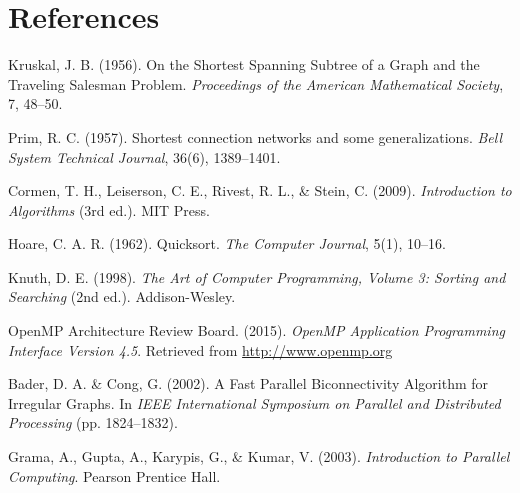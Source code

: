 \documentclass[11pt]{article}
\begin{document}
\section*{References}
\begin{thebibliography}{9}

Kruskal, J. B. (1956). On the Shortest Spanning Subtree of a Graph and the Traveling Salesman Problem. \textit{Proceedings of the American Mathematical Society}, 7, 48–50.

Prim, R. C. (1957). Shortest connection networks and some generalizations. \textit{Bell System Technical Journal}, 36(6), 1389–1401.

Cormen, T. H., Leiserson, C. E., Rivest, R. L., \& Stein, C. (2009). \textit{Introduction to Algorithms} (3rd ed.). MIT Press.

Hoare, C. A. R. (1962). Quicksort. \textit{The Computer Journal}, 5(1), 10–16.

Knuth, D. E. (1998). \textit{The Art of Computer Programming, Volume 3: Sorting and Searching} (2nd ed.). Addison-Wesley.

OpenMP Architecture Review Board. (2015). \textit{OpenMP Application Programming Interface Version 4.5}. Retrieved from \url{http://www.openmp.org}

Bader, D. A. \& Cong, G. (2002). A Fast Parallel Biconnectivity Algorithm for Irregular Graphs. In \textit{IEEE International Symposium on Parallel and Distributed Processing} (pp. 1824–1832).

Grama, A., Gupta, A., Karypis, G., \& Kumar, V. (2003). \textit{Introduction to Parallel Computing}. Pearson Prentice Hall.

\end{thebibliography}
\end{document}
